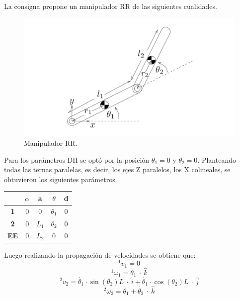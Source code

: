 %

%

La consigna propone un manipulador RR de las siguientes cualidades.
\begin{figure}[H]
	\centering
	\includegraphics[width=0.8\linewidth]{ImagenesDeducción de modelo/brazo}
	\caption{Manipulador RR.}	
	\label{fig:brazo}
\end{figure}

Para los parámetros DH se optó por la posición $\theta_1 = 0$ y $\theta_2 = 0$.
Planteando todas las ternas paralelas, es decir, los ejes Z paralelos, los X colineales, se obtuvieron los siguientes parámetros.
\begin{table}[H]
\centering
\begin{tabular}{ccccc}
\hline
\textbf{}   & \textbf{$\alpha$} & \textbf{a} & \textbf{$\theta$} & \textbf{d} \\ \hline
\textbf{1}  & 0                 & 0          & $\theta_1$        & 0          \\
\textbf{2}  & 0                 & $L_1$      & $\theta_2$        & 0          \\
\textbf{EE} & 0                 & $L_2$      & 0                 & 0          \\ \hline
\end{tabular}
\end{table}

Luego realizando la propagación de velocidades se obtiene que:
\begin{equation}
^1v_1 = 0 
\end{equation}
\begin{equation}
^1\omega_1= \dot{\theta_1} \ \cdot \ \hat{k}
\end{equation}
\begin{equation}
^2v_2 = \dot{\theta_1} \cdot \sin(\theta_2)L \  \cdot \ \hat{i} + \dot{\theta_1} \cdot \cos(\theta_2)L  \ \cdot \  \hat{j}
\end{equation}
\begin{equation}
^2\omega_2= \dot{\theta_1}+\dot{\theta_2}  \ \cdot \ \hat{k}
\end{equation}

